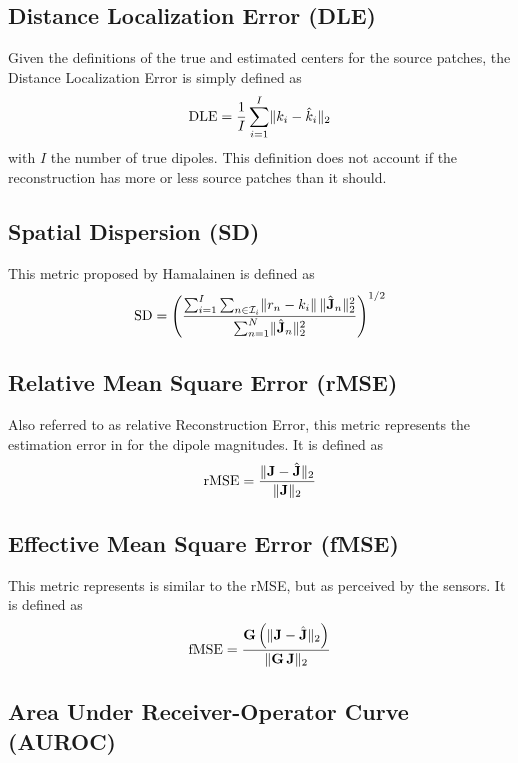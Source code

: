 \subsection{Distance Localization Error (DLE)}

Given the definitions of the true and estimated centers for the source patches, the Distance Localization Error is simply defined as
\begin{equation}
\text{DLE} = 
\frac{1}{I} \sum_{i=1}^I \lVert  k_i - \hat{k}_i  \rVert_2
\label{def:DLE}
\end{equation}
with $I$ the number of true dipoles.
%
This definition does not account if the reconstruction has more or less source patches than it should.

\subsection{Spatial Dispersion (SD)}

This metric proposed by Hamalainen is defined as
\begin{equation}
\text{SD}
=
\left( 
\frac{ \sum_{i=1}^I \sum_{n\in \mathcal{I}_i} \lVert r_n-k_i \rVert\,  \lVert \hat{\mathbf{J}}_n \rVert_2^2 }{\sum_{n=1}^N \lVert \hat{\mathbf{J}}_n \rVert_2^2}
 \right)^{1/2}
\end{equation}

\subsection{Relative Mean Square Error (rMSE)}

Also referred to as relative Reconstruction Error, this metric represents the estimation error in for the dipole magnitudes. 
%
It is defined as
\begin{equation}
\text{rMSE} = 
\frac{\lVert \mathbf{J} - \hat{\mathbf{J}} \rVert_2}{\lVert \mathbf{J} \rVert_2}
\end{equation}

\subsection{Effective Mean Square Error (fMSE)}

This metric represents is similar to the rMSE, but as perceived by the sensors.
%
It is defined as
\begin{equation}
\text{fMSE} = 
\frac{\mathbf{G}\left( \lVert \mathbf{J} - \hat{\mathbf{J}} \rVert_2 \right)}{\lVert \mathbf{G}\, \mathbf{J} \rVert_2}
\end{equation}

\subsection{Area Under Receiver-Operator Curve (AUROC)}

